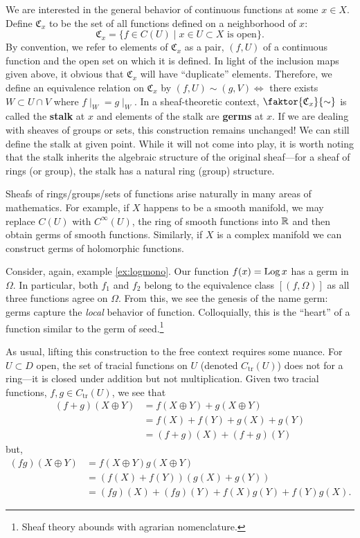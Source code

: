 We are interested in the general behavior of continuous functions at some
\(x \in X\). Define \(\mathfrak{C}_x\) to be the set of all functions defined on a
neighborhood of \(x\):
\[
  \mathfrak{C}_x = \{f \in C(U) \mid x \in U \subset X \text{ is open}\}.
\]
By convention, we refer to elements of \(\mathfrak{C}_x\) as a pair, \((f,U)\) of
a continuous function and the open set on which it is defined.
In light of the inclusion maps given above, it obvious that \(\mathfrak{C}_x\)
will have ``duplicate'' elements. Therefore, we define an equivalence relation
on \(\mathfrak{C}_x\) by \((f,U) \sim (g,V) \Leftrightarrow\) there exists
\(W \subset U \cap V\) where \(f \mid _W = g\mid _W\). In a sheaf-theoretic
context, \(\faktor{\mathfrak{C}_x}{\sim} \) is called the \textbf{stalk} at \(x\)
and elements of the stalk are \textbf{germs} at \(x\). If we are dealing with
sheaves of groups or sets, this construction remains unchanged! We can still
define the stalk at given point. While it will not come into play, it is worth
noting that the stalk inherits the algebraic structure of the original
sheaf---\eg for a sheaf of rings (or group), the stalk has a natural ring
(group) structure.

Sheafs of rings/groups/sets of functions arise naturally in many areas of
mathematics. For example, if \(X\) happens to be a smooth manifold, we may
replace \(C(U)\) with \(C^\infty(U)\), the ring of smooth functions into
\(\mathbb{R} \) and then obtain germs of smooth functions.  Similarly, if \(X\) is a
complex manifold we can construct germs of holomorphic functions.

\begin{example}
Consider, again, example \ref{ex:logmono}. Our function \(f(x)= \operatorname{Log} x\) has
a germ in \(\Omega\). In particular, both \(f_1\) and \(f_2\) belong to the
equivalence class \([(f,\Omega)]\) as all three functions agree on \(\Omega\).
From this, we {\color{fgreen} see the genesis of the name} germ: germs capture the
\emph{local} behavior of function. Colloquially, this is the ``heart'' of a
function similar to the germ of seed.\footnote{Sheaf theory abounds with
  agrarian nomenclature.}
\end{example}


As usual, lifting this construction to the free context requires some nuance.
For \(U \subset D\) open, the set of tracial functions on \(U\) (denoted
\(C_{\text{tr}}(U)\)) does not for a ring---it is closed under addition but not
multiplication. Given two tracial functions, \(f,g \in C_{\text{tr}}(U)\), we see
that
\begin{align*}
  (f+g)(X \oplus Y) &= f(X \oplus Y) + g(X \oplus Y) \\
                    &= f(X) + f(Y)+g(X) + g(Y) \\
                    &= (f+g) (X) + (f+g)(Y)
\end{align*}
but,
\begin{align*}
  (fg)(X \oplus Y) &= f(X \oplus Y)g(X \oplus Y) \\
                   &= (f(X) + f(Y))(g(X) + g(Y)) \\
                   &= (fg) (X) + (fg)(Y) + f(X)g(Y)+f(Y)g(X).
\end{align*}

